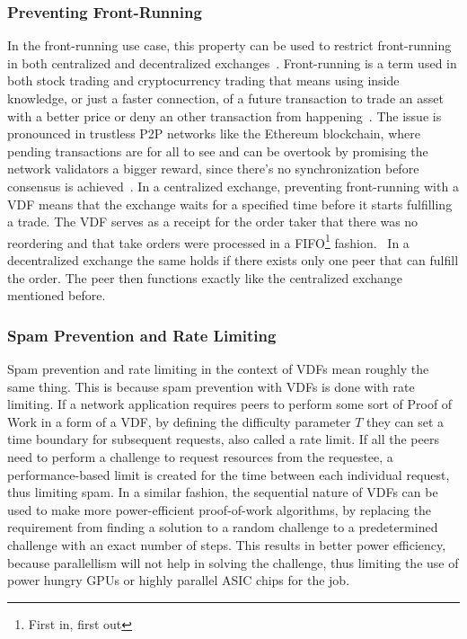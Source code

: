 \subsubsection{Preventing Front-Running}
In the front-running use case, this property can be used to restrict front-running in both centralized and decentralized exchanges~\cite{Rami_Khalil_and_Arthur_Gervais_and_Guillaume_Felley2019-sl}. Front-running is a term used in both stock trading and cryptocurrency trading that means using inside knowledge, or just a faster connection, of a future transaction to trade an asset with a better price or deny an other transaction from happening~\cite{Robinson2020-ve}. The issue is pronounced in trustless P2P networks like the Ethereum blockchain, where pending transactions are for all to see and can be overtook by promising the network validators a bigger reward, since there's no synchronization before consensus is achieved~\cite{Mitchell2020-hn}. In a centralized exchange, preventing front-running with a VDF means that the exchange waits for a specified time before it starts fulfilling a trade. The VDF serves as a receipt for the order taker that there was no reordering and that take orders were processed in a FIFO\footnote{First in, first out} fashion.~\cite{Cline2020-wb} In a decentralized exchange the same holds if there exists only one peer that can fulfill the order. The peer then functions exactly like the centralized exchange mentioned before.

\subsubsection{Spam Prevention and Rate Limiting}
Spam prevention and rate limiting in the context of VDFs mean roughly the same thing. This is because spam prevention with VDFs is done with rate limiting. If a network application requires peers to perform some sort of Proof of Work in a form of a VDF, by defining the difficulty parameter \(T\) they can set a time boundary for subsequent requests, also called a rate limit. If all the peers need to perform a challenge to request resources from the requestee, a performance-based limit is created for the time between each individual request, thus limiting spam. In a similar fashion, the sequential nature of VDFs can be used to make more power-efficient proof-of-work algorithms, by replacing the requirement from finding a solution to a random challenge to a predetermined challenge with an exact number of steps. This results in better power efficiency, because parallellism will not help in solving the challenge, thus limiting the use of power hungry GPUs or highly parallel ASIC chips for the job.

